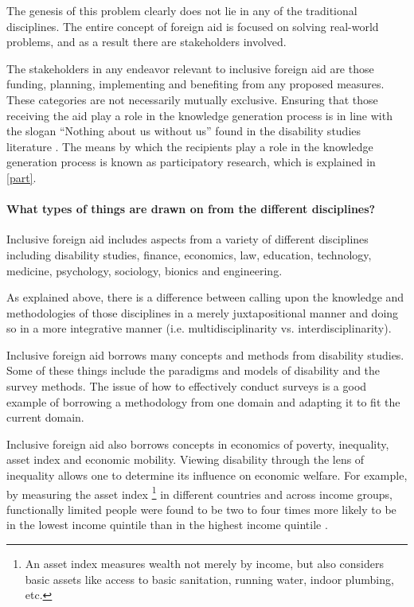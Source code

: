 \documentclass[a4paper]{article}
\begin{document}
The genesis of this problem clearly does not lie in any of the traditional
disciplines. The entire concept of foreign aid is focused on solving
real-world problems, and as a result there are stakeholders involved.

The stakeholders in any endeavor relevant to inclusive foreign aid are those
funding, planning, implementing and benefiting from any proposed measures.
These categories are not necessarily mutually exclusive. Ensuring that those
receiving the aid play a role in the knowledge generation process is in line
with the slogan ``Nothing about us without us'' found in the disability
studies literature \citep{pfeiffer2000disability}. The means by which the
recipients play a role in the knowledge generation process is known as
participatory research, which is explained in \autoref{part}.

\paragraph{What types of things are drawn on from the different disciplines?}

Inclusive foreign aid includes aspects from a variety of different disciplines
including disability studies, finance, economics, law, education, technology,
medicine, psychology, sociology, bionics and engineering.

As explained above, there is a difference between calling upon the knowledge and
methodologies of those disciplines in a merely juxtapositional manner and
doing so in a more integrative manner (i.e. multidisciplinarity vs.
interdisciplinarity).

Inclusive foreign aid borrows many concepts and methods from disability
studies. Some of these things include the paradigms and models of disability
and the survey methods. The issue of how to effectively conduct surveys is a
good example of borrowing a methodology from one domain and adapting it to fit
the current domain.

Inclusive foreign aid also borrows concepts in economics of poverty,
inequality, asset index and economic mobility. Viewing disability through the
lens of inequality allows one to determine its influence on economic welfare.
For example, by measuring the asset index \footnote{An asset index measures
wealth not merely by income, but also considers basic assets like access to
basic sanitation, running water, indoor plumbing, etc.} in different countries
and across income groups, functionally limited people were found to be two to
four times more likely to be in the lowest income quintile than in the highest
income quintile \citep{mitra2018disability}.
\end{document}
